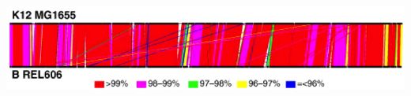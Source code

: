\begin{frame}
\begin{columns}[c]
        \includegraphics[width=\textwidth]{images/ltee_linear}        
    \end{columns}  
\end{frame}